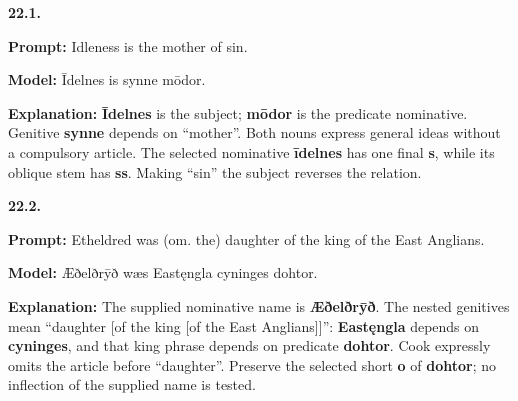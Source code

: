 \par\begin{minipage}{\linewidth}\raggedright
\textbf{22.1.}

\textbf{Prompt:} Idleness is the mother of sin.

\textbf{Model:} Īdelnes is synne mōdor.

\textbf{Explanation:} \textbf{Īdelnes} is the subject; \textbf{mōdor} is the predicate nominative. Genitive \textbf{synne} depends on “mother”. Both nouns express general ideas without a compulsory article. The selected nominative \textbf{īdelnes} has one final \textbf{s}, while its oblique stem has \textbf{ss}. Making “sin” the subject reverses the relation.

\end{minipage}\par\addvspace{4pt}

\par\begin{minipage}{\linewidth}\raggedright
\textbf{22.2.}

\textbf{Prompt:} Etheldred was (om. the) daughter of the king of the East Anglians.

\textbf{Model:} Æðelðrȳð wæs Eastęngla cyninges dohtor.

\textbf{Explanation:} The supplied nominative name is \textbf{Æðelðrȳð}. The nested genitives mean “daughter [of the king [of the East Anglians]]”: \textbf{Eastęngla} depends on \textbf{cyninges}, and that king phrase depends on predicate \textbf{dohtor}. Cook expressly omits the article before “daughter”. Preserve the selected short \textbf{o} of \textbf{dohtor}; no inflection of the supplied name is tested.

\end{minipage}\par\addvspace{4pt}

